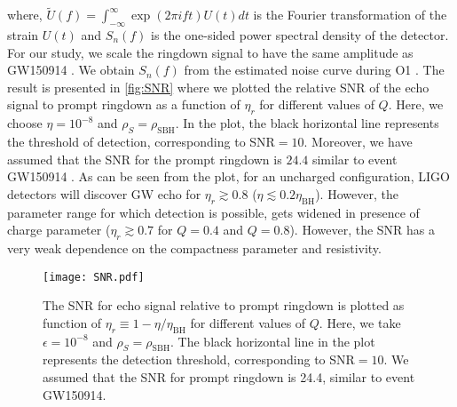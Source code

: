 \documentclass[aps,prd,twocolumn,floatfix,noshowpacs,tightenlines,noshowkeys,superscriptaddress,amsmath,amssymb,
nofootinbib]{revtex4-1}
\renewcommand\[{\begin{equation}}
\renewcommand\]{\end{equation}}
\begin{document}
where, $\tilde{U}(f)=\int_{-\infty}^{\infty}\exp(2\pi i ft)U(t)dt$ is the Fourier transformation of the strain $U(t)$ and $S_n(f)$ is the one-sided power spectral density of the detector. For our study, we scale the ringdown signal to have the same amplitude as GW150914 \cite{Abbott:2016izl, LIGOdat}. We obtain $S_n(f)$ from the estimated noise curve during O1 \cite{LIGOGWOSC,LIGOASD}. The result is presented in \autoref{fig:SNR} where we plotted the relative SNR of the echo signal to prompt ringdown as a function of $\eta_r$ for different values of $Q$. Here, we choose $\eta=10^{-8}$ and $\rho_{S}=\rho_{\textrm{SBH}}$. In the plot, the black horizontal line represents the threshold of detection, corresponding to SNR$=10$. Moreover, we have assumed that the SNR for the prompt ringdown is $24.4$ similar to event GW150914 \cite{TheLIGOScientific:2016qqj,SNRdat}. As can be seen from the plot, for an uncharged configuration, LIGO detectors will discover GW echo for $\eta_r\gtrsim 0.8$ ($\eta\lesssim 0.2 \eta_{\textrm{BH}}$). However, the parameter range for which detection is possible, gets widened in presence of charge parameter ($\eta_r\gtrsim 0.7$ for $Q=0.4$ and $Q=0.8$). However, the SNR has a very weak dependence on the compactness parameter and resistivity.  
\begin{figure}[t!]
	\centering
	\texttt{[image: SNR.pdf]}
	\caption{
		The SNR for echo signal relative to prompt ringdown is plotted as function of $\eta_r\equiv1-\eta/\eta_{\textrm{BH}}$ for different values of $Q$. Here, we take $\epsilon=10^{-8}$ and $\rho_{S}=\rho_{\textrm{SBH}}$. The black horizontal line in the plot represents the detection threshold, corresponding to SNR$=10$. We assumed that the SNR for prompt ringdown is 24.4, similar to event GW150914. 
	} 
	\label{fig:SNR}
\end{figure}
\end{document}
